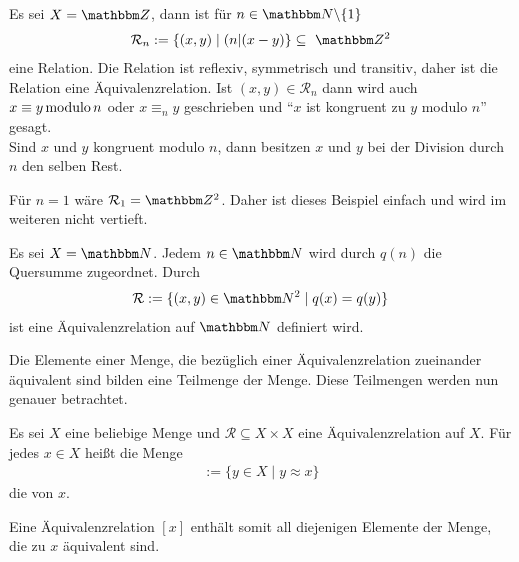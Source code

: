 \begin{Unit}[Beispiel] 
  Es sei $X = \ZZ$, dann ist für $n \in \NN \backslash \{1\}$
  \begin{align}
    \mathcal{R}_n := \{ (x,y) \mid  (n|(x - y) \} \subseteq\ \ZZ^2
  \end{align}
  eine Relation. Die Relation ist reflexiv, symmetrisch und transitiv, daher 
  ist die Relation eine Äquivalenzrelation. Ist $(x, y) \in \mathcal{R}_n$ 
  dann wird auch $x \equiv y \operatorname{modulo} n$ oder $x \equiv_n y$ geschrieben und 
  \enquote{$x$ ist kongruent zu $y$ modulo $n$} gesagt. \\
  Sind $x$ und $y$ kongruent modulo $n$, dann besitzen $x$ und $y$ bei der 
  Division durch $n$ den selben Rest.

Für $n = 1$ wäre $\mathcal{R}_1 = \ZZ^2$. Daher ist dieses Beispiel einfach 
und wird im weiteren nicht vertieft.
\end{Unit}

\begin{Unit}[Beispiel]
  Es sei $X = \NN$. Jedem $n \in \NN$ wird durch $q(n)$ die Quersumme 
  zugeordnet. Durch
  \begin{align}
    \mathcal{R} := \{ (x,y) \in \NN^2 \mid q(x) = q(y) \}
  \end{align}
  ist eine Äquivalenzrelation auf $\NN$ definiert wird.
\end{Unit}

\begin{Unit}
Die Elemente einer Menge, die bezüglich einer Äquivalenzrelation zueinander 
äquivalent sind bilden eine Teilmenge der Menge. Diese Teilmengen werden nun
genauer betrachtet.

\begin{Definition}
  Es sei $X$ eine beliebige Menge und $\mathcal{R} \subseteq X \times X$ eine 
  Äquivalenzrelation auf $X$. Für jedes $x \in X$ heißt die Menge
  \begin{align}
    [x] := \{ y \in X \mid y \approx x \}
  \end{align}
  die  von $x$.
\end{Definition}

Eine Äquivalenzrelation $[x]$ enthält somit all diejenigen Elemente der Menge, 
die zu $x$ äquivalent sind.
\end{Unit}

